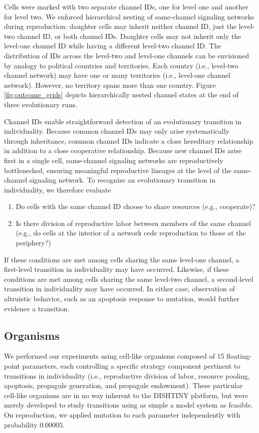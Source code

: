 Cells were marked with two separate channel IDs, one for level one and another for level two.
We enforced hierarchical nesting of same-channel signaling networks during reproduction:
daughter cells may inherit neither channel ID, just the level-two channel ID, or both channel IDs.
Daughter cells may not inherit only the level-one channel ID while having a different level-two channel ID.
The distribution of IDs across the level-two and level-one channels can be envisioned by analogy to political countries and territories.
Each country (i.e., level-two channel network) may have one or many territories (i.e., level-one channel network).
However, no territory spans more than one country.
Figure \ref{fig:outcome_grids} depicts hierarchically nested channel states at the end of three evolutionary runs.

Channel IDs enable straightforward detection of an evolutionary transition in individuality.
Because common channel IDs may only arise systematically through inheritance, common channel IDs indicate a close hereditary relationship in addition to a close cooperative relationship.
Because new channel IDs arise first in a single cell, same-channel signaling networks are reproductively bottlenecked, ensuring meaningful reproductive lineages at the level of the same-channel signaling network.
To recognize an evolutionary transition in individuality, we therefore evaluate
\begin{enumerate}
\item Do cells with the same channel ID choose to share resources (e.g., cooperate)?
\item Is there division of reproductive labor between members of the same channel (e.g., do cells at the interior of a network cede reproduction to those at the periphery?)
\end{enumerate}
If these conditions are met among cells sharing the same level-one channel, a first-level transition in individuality may have occurred.
Likewise, if these conditions are met among cells sharing the same level-two channel, a second-level transition in individuality may have occurred.
In either case, observation of altruistic behavior, such as an apoptosis response to mutation, would further evidence a transition.

\subsection{Organisms}

We performed our experiments using cell-like organisms composed of 15 floating-point parameters, each controlling a specific strategy component pertinent to transitions in individuality (i.e., reproductive division of labor, resource pooling, apoptosis, propagule generation, and propagule endowment).
These particular cell-like organisms are in no way inherent to the DISHTINY platform, but were merely developed to study transitions using as simple a model system as feasible.
On reproduction, we applied mutation to each parameter independently with probability $0.00005$.

